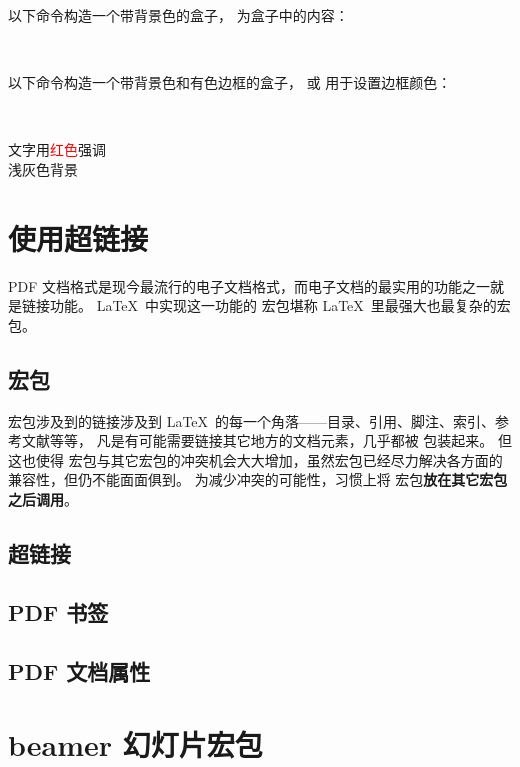 以下命令构造一个带背景色的盒子， 为盒子中的内容：
\begin{command}
 \\
\end{command}

以下命令构造一个带背景色和有色边框的盒子， 或  用于设置边框颜色：
\begin{command}
 \\
\end{command}

\begin{example}
\sffamily
文字用\textcolor{red}{红色}强调\\
\colorbox[gray]{0.95}{浅灰色背景} \\
\end{example}

\section{使用超链接}

PDF 文档格式是现今最流行的电子文档格式，而电子文档的最实用的功能之一就是链接功能。
\LaTeX\ 中实现这一功能的  宏包堪称 \LaTeX\ 里最强大也最复杂的宏包。

\subsection{ 宏包}

 宏包涉及到的链接涉及到 \LaTeX\ 的每一个角落——目录、引用、脚注、索引、参考文献等等，
凡是有可能需要链接其它地方的文档元素，几乎都被  包装起来。
但这也使得  宏包与其它宏包的冲突机会大大增加，虽然宏包已经尽力解决各方面的兼容性，但仍不能面面俱到。
为减少冲突的可能性，习惯上将  宏包\textbf{放在其它宏包之后调用}。

\subsection{超链接}

\subsection{PDF 书签}

\subsection{PDF 文档属性}

\section{\textsf{beamer} 幻灯片宏包}

\leavevmode\nobreakspace

\endinput